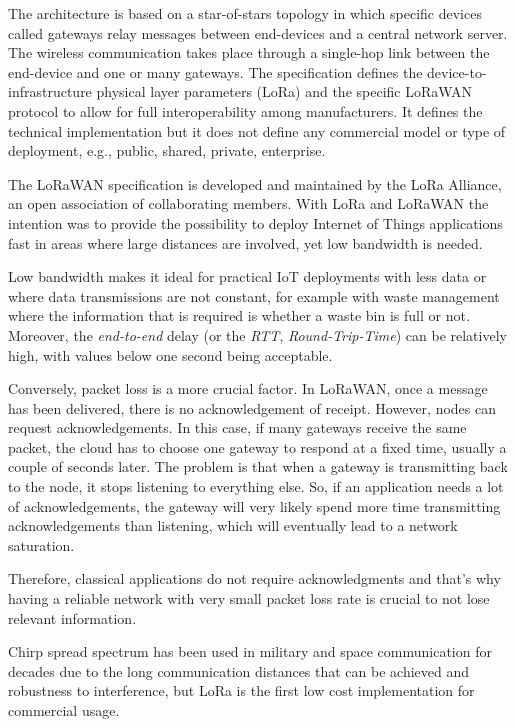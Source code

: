 			The architecture is based on a star-of-stars topology in which speciﬁc devices called gateways relay messages between end-devices and a central network server.
			The wireless communication takes place through a single-hop link between the end-device and one or many gateways.
			The speciﬁcation deﬁnes the device-to-infrastructure physical layer parameters (LoRa) and the speciﬁc LoRaWAN protocol to allow for full interoperability among manufacturers.
			It deﬁnes the technical implementation but it does not deﬁne any commercial model or type of deployment, e.g., public, shared, private, enterprise. 
			
			The LoRaWAN speciﬁcation is developed and maintained by the LoRa Alliance, an open association of collaborating members. 
			With LoRa and LoRaWAN the intention was to provide the possibility to deploy Internet of Things applications fast in areas where large distances are involved, yet low bandwidth is needed.
			
			Low bandwidth makes it ideal for practical IoT deployments with less data or where data transmissions are not constant, for example with waste management where the information that is required is whether a waste bin is full or not.
			Moreover, the \textit{end-to-end} delay (or the \textit{RTT}, \textit{Round-Trip-Time}) can be relatively high, with values below one second being acceptable.
			
			Conversely, packet loss is a more crucial factor.
			In LoRaWAN, once a message has been delivered, there is no acknowledgement of receipt.
			However, nodes can request acknowledgements.
			In this case, if many gateways receive the same packet, the cloud has to choose one gateway to respond
			at a ﬁxed time, usually a couple of seconds later.
			The problem is that when a gateway is transmitting back to the node, it stops listening to everything else.
			So, if an application needs a lot of acknowledgements, the gateway will very likely spend more time transmitting acknowledgements than listening, which will eventually lead to a network saturation.
			
			Therefore, classical applications do not require acknowledgments and that's why having a reliable network with very small packet loss rate is crucial to not lose relevant information.
			
			Chirp spread spectrum has been used in military and space communication for decades due to the long
			communication distances that can be achieved and robustness to interference, but LoRa is the ﬁrst low cost implementation for commercial usage.
			

